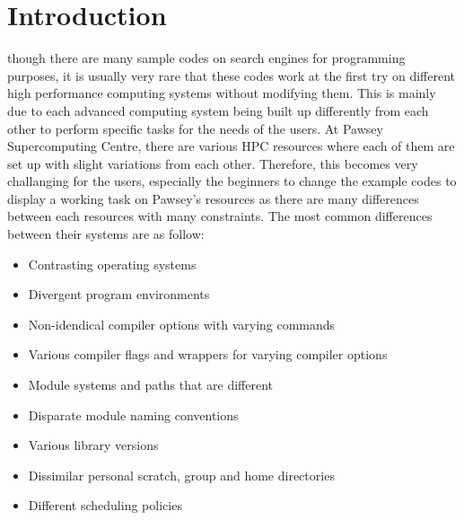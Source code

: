 \documentclass[journal]{IEEEtran}
\begin{document}
\section{Introduction}

 though there are many sample codes on search engines for programming purposes, it is usually very rare that these codes work at 
the first try on different high performance computing systems without modifying them. This is mainly due to each advanced computing system being built 
up differently from each other to perform specific tasks for the needs of the users. At Pawsey Supercomputing Centre, there are various HPC resources 
where each of them are set up with slight variations from each other. Therefore, this becomes very challanging for the users, especially the beginners 
to change the example codes to display a working task on Pawsey's resources as there are many differences between each resources with many constraints. 
The most common differences between their systems are as follow:

\begin{itemize}
\item Contrasting operating systems 
\item Divergent program environments
\item Non-idendical compiler options with varying commands
\item Various compiler flags and wrappers for varying compiler options
\item Module systems and paths that are different
\item Disparate module naming conventions
\item Various library versions
\item Dissimilar personal scratch, group and home directories
\item Different scheduling policies
\end{itemize}
\end{document}
